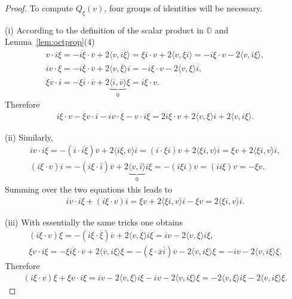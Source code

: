 \documentclass[10pt,a4paper]{amsart}
\numberwithin{equation}{section}
\newcommand{\SO}{\mathbb{O}} %
\begin{document}
\begin{proof} To compute $Q_\xi(v)$, four groups of identities will be necessary.

(i) According to the definition of the scalar product in $\SO$ and Lemma~\ref{lem:octprop}(4)
 \begin{gather*}
 v \cdot i\xi=-\overline{i\xi} \cdot \overline{v}+2\langle v, \overline{i\xi} \rangle = \xi i \cdot v + 2\langle v, \xi i \rangle = -i \xi \cdot v - 2\langle v, i \xi \rangle,\\
 iv\cdot \xi= -i\overline{\xi}\cdot \overline{v}+2 \langle v, \overline{\xi} \rangle i= -i\xi\cdot v - 2 \langle v, \xi \rangle i,\\
 \xi v \cdot i=-\xi \overline{i}\cdot \overline{v}+2 \underbrace{\langle i, \overline{v} \rangle}_0 \xi=i \xi \cdot v.
 \end{gather*}
 Therefore
 \begin{gather}
 i\xi \cdot v-\xi v \cdot i- iv\cdot \xi-v\cdot i\xi=2i\xi\cdot v +2 \langle v,\xi \rangle i+2\langle v,i \xi \rangle. \label{eq:gxi1}
 \end{gather}

(ii) Similarly,
 \begin{gather*}
 iv\cdot i\xi =-(i\cdot \overline{i\xi})\overline{v}+2\langle i\xi,\overline{v}\rangle i=(i\cdot \xi i)v+2\langle \xi i,v \rangle i=\xi v +2\langle \xi i,v \rangle i,\\
 (i\xi\cdot v)i =-(i\xi\cdot\overline{i})\overline{v}+2\underbrace{\langle v, \overline{i} \rangle}_0 i\xi=-(i\xi i)v=(ii\xi)v=-\xi v.
 \end{gather*}
 Summing over the two equations this leads to
 \begin{gather}
 iv\cdot i\xi+(i\xi\cdot v)i=\xi v +2\langle \xi i,v \rangle i-\xi v=2\langle \xi i,v \rangle i. \label{eq:gxi2}
 \end{gather}

(iii) With essentially the same tricks one obtains
 \begin{gather*}
 (i\xi \cdot v)\xi=-(i\xi \cdot \overline{\xi})\overline{v}+2 \langle v,\overline{\xi}\rangle i\xi=iv-2\langle v ,\xi \rangle i\xi,\\
 \xi v\cdot i\xi=-\xi \overline{i\xi}\cdot \overline{v}+2 \langle\overline{v},i\xi\rangle\xi=-(\xi\cdot \overline{x}\overline{i})\overline{v}-2\langle v,i\xi\rangle\xi =-iv-2\langle v,i\xi \rangle\xi.
 \end{gather*}
 Therefore
 \begin{gather}
 (i\xi\cdot v)\xi+\xi v\cdot i\xi=iv-2\langle v ,\xi \rangle i\xi-iv-2\langle v,i\xi \rangle\xi=-2\langle v ,\xi \rangle i\xi-2\langle v,i\xi \rangle\xi. \label{eq:gxi3}
 \end{gather}


\end{proof}
\end{document}
